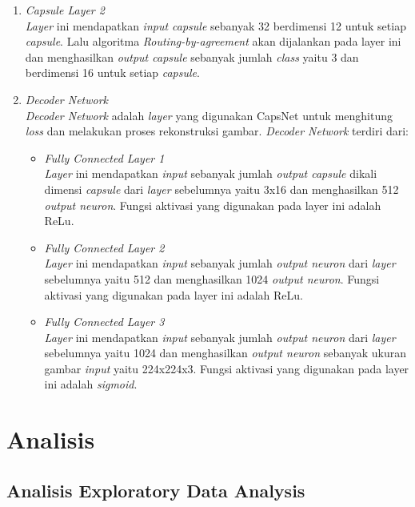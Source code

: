 \documentclass{article}
\begin{document}
\begin{enumerate}
		\item \textit{Capsule Layer 2}\\
		\textit{Layer} ini mendapatkan \textit{input capsule} sebanyak 32 berdimensi 12 untuk setiap \textit{capsule}. Lalu algoritma \textit{Routing-by-agreement} akan dijalankan pada layer ini dan menghasilkan \textit{output capsule} sebanyak jumlah \textit{class} yaitu 3 dan berdimensi 16 untuk setiap \textit{capsule}.
		
		\item \textit{Decoder Network}\\
		\textit{Decoder Network} adalah \textit{layer} yang digunakan CapsNet untuk menghitung \textit{loss} dan melakukan proses rekonstruksi gambar. \textit{Decoder Network} terdiri dari:
		\begin{itemize}
			\item \textit{Fully Connected Layer 1}\\
			\textit{Layer} ini mendapatkan \textit{input} sebanyak jumlah \textit{output capsule} dikali dimensi \textit{capsule} dari \textit{layer} sebelumnya yaitu 3x16 dan menghasilkan 512 \textit{output neuron}. Fungsi aktivasi yang digunakan pada layer ini adalah ReLu.
			
			\item \textit{Fully Connected Layer 2}\\
			\textit{Layer} ini mendapatkan \textit{input} sebanyak jumlah \textit{output neuron} dari \textit{layer} sebelumnya yaitu 512 dan menghasilkan 1024 \textit{output neuron}. Fungsi aktivasi yang digunakan pada layer ini adalah ReLu.
			
			\item \textit{Fully Connected Layer 3}\\
			\textit{Layer} ini mendapatkan \textit{input} sebanyak jumlah \textit{output neuron} dari \textit{layer} sebelumnya yaitu 1024 dan menghasilkan \textit{output neuron} sebanyak ukuran gambar \textit{input} yaitu 224x224x3. Fungsi aktivasi yang digunakan pada layer ini adalah \textit{sigmoid}.
		\end{itemize}
		
	\end{enumerate}
   \newpage
   \section{Analisis}
    \subsection{Analisis Exploratory Data Analysis}
     	
\end{document}
